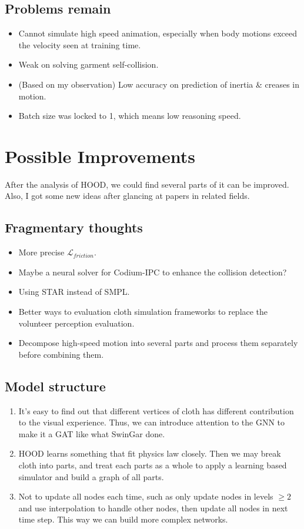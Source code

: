 \documentclass{article}
\begin{document}
\subsection{Problems remain}
\begin{itemize}
    \item Cannot simulate high speed animation, especially when body motions exceed the velocity seen at training time.
    \item Weak on solving garment self-collision.
    \item (Based on my observation) Low accuracy on prediction of inertia \& creases in motion.
    \item Batch size was locked to 1, which means low reasoning speed.
\end{itemize}

\section{Possible Improvements}
\par After the analysis of HOOD, we could find several parts of it can be improved. Also, I got some new ideas after glancing at papers in related fields.
\subsection{Fragmentary thoughts}
\begin{itemize}
    \item More precise $\mathcal{L}_{friction}$.
    \item Maybe a neural solver for Codium-IPC\cite{li2020codimensional} to enhance the collision detection?
    \item Using STAR\cite{STAR:2020} instead of SMPL\cite{SMPL:2015}.
    \item Better ways to evaluation cloth simulation frameworks to replace the volunteer perception evaluation.
    \item Decompose high-speed motion into several parts and process them separately before combining them.
\end{itemize}
\subsection{Model structure}
\begin{enumerate}
    \item It's easy to find out that different vertices of cloth has different contribution to the visual experience. Thus, we can introduce attention to the GNN to make it a GAT like what SwinGar\cite{li2023swingar} done.
    \item HOOD learns something that fit physics law closely. Then we may break cloth into parts, and treat each parts as a whole to apply a learning based simulator and build a graph of all parts.
    \item Not to update all nodes each time, such as only update nodes in levels $\ge 2$ and use interpolation to handle other nodes, then update all nodes in next time step. This way we can build more complex networks.
\end{enumerate}
\end{document}
